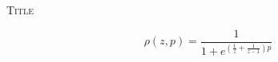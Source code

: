 \documentclass[]{article}
\title{}
\author{}
\newenvironment{mymath}{
\Large
\begin{equation*}
}{
\end{equation*}
\normalsize
}
\begin{document}
\begin{center}
\textsc{Title}
\end{center}

\begin{mymath}
\rho(z,p) = \frac{1}{1 + e^{\left( \frac{1}{z} + \frac{1}{z-1}\right) p}}
\end{mymath}
\end{document}

